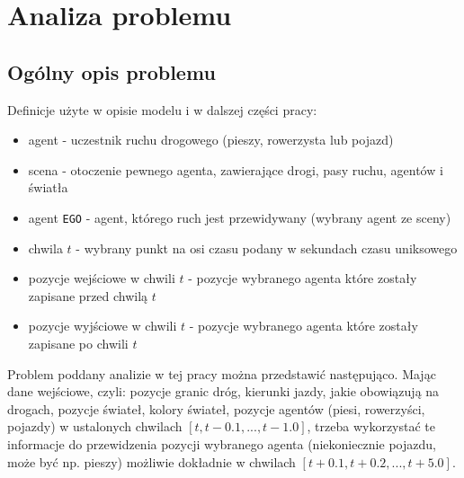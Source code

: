 \chapter{Analiza problemu}
\thispagestyle{chapterBeginStyle}
\label{rozdzial1}

\section{Ogólny opis problemu}

\noindent Definicje użyte w opisie modelu i w dalszej części pracy:
\begin{itemize}
    \setlength{\itemsep}{1pt}
    \setlength{\parskip}{0pt}
    \setlength{\parsep}{0pt}
    \item agent - uczestnik ruchu drogowego (pieszy, rowerzysta lub pojazd)
    \item scena - otoczenie pewnego agenta, zawierające drogi, pasy ruchu, agentów i światła
    \item agent \texttt{EGO} - agent, którego ruch jest przewidywany (wybrany agent ze sceny)
    \item chwila $t$ - wybrany punkt na osi czasu podany w sekundach czasu uniksowego
    \item pozycje wejściowe w chwili $t$ - pozycje wybranego agenta które zostały zapisane przed chwilą $t$
    \item pozycje wyjściowe w chwili $t$ - pozycje wybranego agenta które zostały zapisane po chwili $t$
\end{itemize}

Problem poddany analizie w tej pracy można przedstawić następująco. Mając dane wejściowe, czyli: pozycje granic dróg, kierunki jazdy, jakie obowiązują na drogach, pozycje świateł, kolory świateł, pozycje agentów (piesi, rowerzyści, pojazdy) w ustalonych chwilach \mbox{$[t, t-0.1, ... , t-1.0]$}, trzeba wykorzystać te informacje do przewidzenia pozycji wybranego agenta (niekoniecznie pojazdu, może być np. pieszy) możliwie dokładnie w chwilach \mbox{$[t+0.1, t+0.2, ... , t+5.0]$}.

